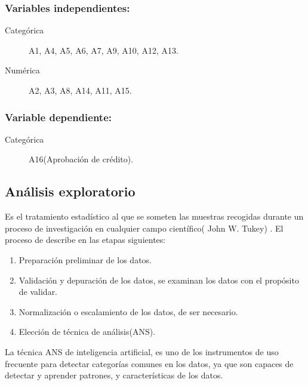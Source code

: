 \documentclass[11pt,titlepage]{report}
\begin{document}
\subsubsection{Variables independientes:} 
\begin{description}
	\item[Categórica] A1, A4, A5, A6, A7, A9, A10, A12, A13. 
	\item[Numérica] A2, A3, A8, A14, A11, A15.
\end{description} 

\subsubsection{Variable dependiente:} 
\begin{description}
	\item[Categórica] A16(Aprobación de crédito).
\end{description}   

\subsection{Análisis exploratorio}
Es el tratamiento estadístico al que se someten las muestras recogidas durante un proceso de investigación en cualquier campo científico( John W. Tukey) \cite{Int08}. El proceso de describe en las etapas siguientes:

\begin{enumerate}
	\item Preparación preliminar de los datos.
	\item Validación y depuración de los datos, se examinan los datos con el propósito de validar.
	\item Normalización o escalamiento de los datos, de ser necesario.
	\item Elección de técnica de análisis(ANS).
\end{enumerate}

La técnica ANS de inteligencia artificial, es uno de los instrumentos de uso frecuente para detectar categorías comunes en los datos, ya que son capaces de detectar y aprender patrones, y características de los datos. 
\end{document}
